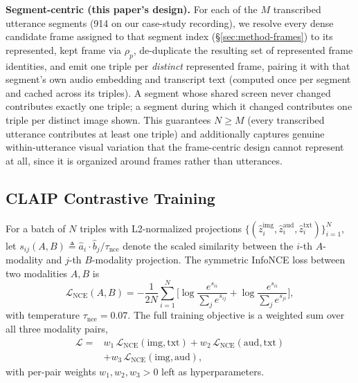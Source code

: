 ﻿\documentclass[twocolumn]{article}
\begin{document}
\textbf{Segment-centric (this paper's design).} For each of the $M$ transcribed utterance segments
(914 on our case-study recording), we resolve every dense candidate frame assigned to that segment
index (\S\ref{sec:method-frames}) to its represented, kept frame via $\rho_p$, de-duplicate the
resulting set of represented frame identities, and emit one triple per \emph{distinct} represented
frame, pairing it with that segment's own audio embedding and transcript text (computed once per
segment and cached across its triples). A segment whose shared screen never changed contributes
exactly one triple; a segment during which it changed contributes one triple per distinct image
shown. This guarantees $N \geq M$ (every transcribed utterance contributes at least one triple) and
additionally captures genuine within-utterance visual variation that the frame-centric design cannot
represent at all, since it is organized around frames rather than utterances.

\subsection{CLAIP Contrastive Training}
\label{sec:method-training}

For a batch of $N$ triples with L2-normalized projections $\{(\hat{z}^{\text{img}}_i,
\hat{z}^{\text{aud}}_i, \hat{z}^{\text{txt}}_i)\}_{i=1}^N$, let $s_{ij}(A,B) \triangleq
\hat{a}_i \cdot \hat{b}_j / \tau_{\text{nce}}$ denote the scaled similarity between the $i$-th
$A$-modality and $j$-th $B$-modality projection. The symmetric InfoNCE loss between two modalities
$A, B$ is
\begin{equation}
  \mathcal{L}_{\text{NCE}}(A,B) = -\frac{1}{2N}\sum_{i=1}^N \bigg[
    \log \frac{e^{s_{ii}}}{\sum_j e^{s_{ij}}}
    + \log \frac{e^{s_{ii}}}{\sum_j e^{s_{ji}}} \bigg],
  \label{eq:infonce}
\end{equation}
with temperature $\tau_{\text{nce}}=0.07$. The full training objective is a weighted sum over all
three modality pairs,
\begin{equation}
\begin{aligned}
  \mathcal{L} = {} & w_1\, \mathcal{L}_{\text{NCE}}(\text{img},\text{txt})
    + w_2\, \mathcal{L}_{\text{NCE}}(\text{aud},\text{txt}) \\
    & + w_3\, \mathcal{L}_{\text{NCE}}(\text{img},\text{aud}),
\end{aligned}
  \label{eq:weighted-infonce}
\end{equation}
with per-pair weights $w_1, w_2, w_3 > 0$ left as hyperparameters.
\end{document}
